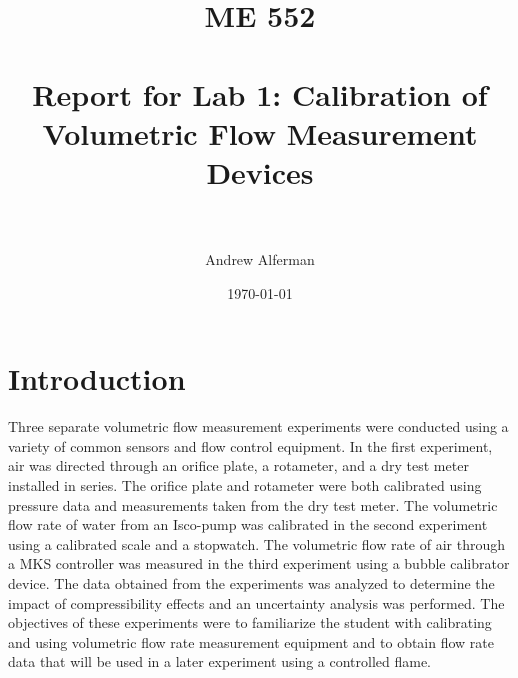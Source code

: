 \documentclass[paper=letter, fontsize=10pt]{scrartcl} %
\title{	
\normalfont \normalsize 
\textsc{ME 552} \\ [25pt] %
\horrule{0.5pt} \\[0.4cm] %
\huge Report for Lab 1: Calibration of Volumetric Flow Measurement Devices \\ %
\horrule{2pt} \\[0.5cm] %
}
\author{Andrew Alferman} %
\date{\normalsize\today} %
\begin{document}

\maketitle %

\section{Introduction}
\label{intro}
Three separate volumetric flow measurement experiments were conducted using a variety of common sensors and flow control equipment.  In the first experiment, air was directed through an orifice plate, a rotameter, and a dry test meter installed in series.  The orifice plate and rotameter were both calibrated using pressure data and measurements taken from the dry test meter.  The volumetric flow rate of water from an Isco-pump was calibrated in the second experiment using a calibrated scale and a stopwatch.  The volumetric flow rate of air through a MKS controller was measured in the third experiment using a bubble calibrator device.  The data obtained from the experiments was analyzed to determine the impact of compressibility effects and an uncertainty analysis was performed.  The objectives of these experiments were to familiarize the student with calibrating and using volumetric flow rate measurement equipment and to obtain flow rate data that will be used in a later experiment using a controlled flame.
\end{document}
